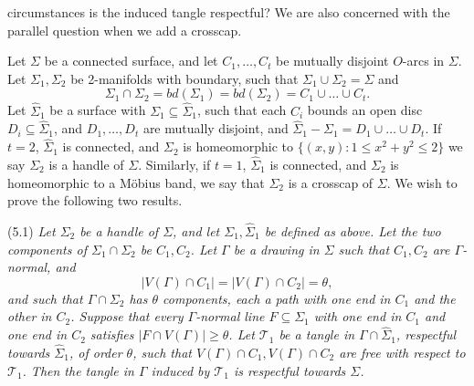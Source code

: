\noindent circumstances is the induced tangle respectful? We are also concerned with the parallel question when we add a crosscap.

Let $\Sigma$ be a connected surface, and let $C_1, \dots, C_t$ be mutually disjoint $O$-arcs in $\Sigma$. Let $\Sigma_1, \Sigma_2$ be 2-manifolds with boundary, such that $\Sigma_1 \cup \Sigma_2 = \Sigma$ and
\begin{equation*}
\Sigma_1 \cap \Sigma_2 = bd(\Sigma_1) = bd(\Sigma_2) = C_1 \cup \dots \cup C_t.
\end{equation*}
Let $\hat{\Sigma}_1$ be a surface with $\Sigma_1 \subseteq \hat{\Sigma}_1$, such that each $C_i$ bounds an open disc $D_i \subseteq \hat{\Sigma}_1$, and $D_1, \dots, D_t$ are mutually disjoint, and $\hat{\Sigma}_1 - \Sigma_1 = D_1 \cup \dots \cup D_t$. If $t = 2$, $\hat{\Sigma}_1$ is connected, and $\Sigma_2$ is homeomorphic to $\{(x, y) \colon 1 \le x^2 + y^2 \le 2\}$ we say $\Sigma_2$ is a handle of $\Sigma$. Similarly, if $t = 1$, $\hat{\Sigma}_1$ is connected, and $\Sigma_2$ is homeomorphic to a M\"obius band, we say that $\Sigma_2$ is a crosscap of $\Sigma$. We wish to prove the following two results.

\stmt
(5.1) \textit{Let $\Sigma_2$ be a handle of $\Sigma$, and let $\Sigma_1, \hat{\Sigma}_1$ be defined as above. Let the two components of $\Sigma_1 \cap \Sigma_2$ be $C_1, C_2$. Let $\Gamma$ be a drawing in $\Sigma$ such that $C_1, C_2$ are $\Gamma$-normal, and}
\begin{equation*}
|V(\Gamma) \cap C_1| = |V(\Gamma) \cap C_2| = \theta,
\end{equation*}
\textit{and such that $\Gamma \cap \Sigma_2$ has $\theta$ components, each a path with one end in $C_1$ and the other in $C_2$. Suppose that every $\Gamma$-normal line $F \subseteq \Sigma_1$ with one end in $C_1$ and one end in $C_2$ satisfies $|F \cap V(\Gamma)| \ge \theta$. Let $\mathscr{T}_1$ be a tangle in $\Gamma \cap \hat{\Sigma}_1$, respectful towards $\hat{\Sigma}_1$, of order $\theta$, such that $V(\Gamma) \cap C_1, V(\Gamma) \cap C_2$ are free with respect to $\mathscr{T}_1$. Then the tangle in $\Gamma$ induced by $\mathscr{T}_1$ is respectful towards $\Sigma$.}

